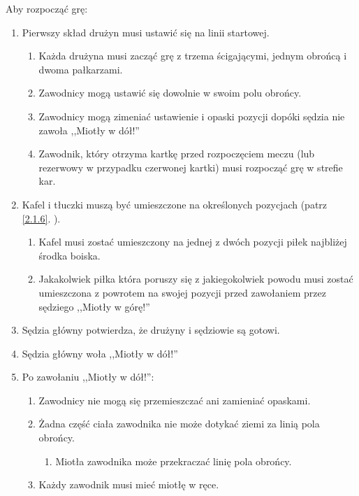 \documentclass[11pt,a4paper]{article}
\renewcommand{\subsubsection}[1]{
  \oldsubsubsection{#1}%
  \label{\thesubsubsection}
}
\newcommand{\myref}[1]{\ref{#1}. \nameref{#1}}
\begin{document}
\subsubsection{Procedura rozpoczęcia}
Aby rozpocząć grę:
\begin{enumerate}
  \item Pierwszy skład drużyn musi ustawić się na linii startowej.
  \begin{enumerate}
    \item Każda drużyna musi zacząć grę z trzema ścigającymi, jednym obrońcą i dwoma pałkarzami.
    \item Zawodnicy mogą ustawić się dowolnie w swoim polu obrońcy.
    \item Zawodnicy mogą zimeniać ustawienie i opaski pozycji dopóki sędzia nie zawoła ,,Miotły w dół!''
    \item Zawodnik, który otrzyma kartkę przed rozpoczęciem meczu (lub rezerwowy w przypadku czerwonej kartki) musi rozpocząć grę w strefie kar.
  \end{enumerate}
  \item Kafel i tłuczki muszą być umieszczone na określonych pozycjach (patrz \myref{2.1.6}).
  \begin{enumerate}
    \item Kafel musi zostać umieszczony na jednej z dwóch pozycji piłek najbliżej środka boiska.
    \item Jakakolwiek piłka która poruszy się z jakiegokolwiek powodu musi zostać umieszczona z
    powrotem na swojej pozycji przed zawołaniem przez sędziego ,,Miotły w górę!''
  \end{enumerate}
  \item Sędzia główny potwierdza, że drużyny i sędziowie są gotowi.
  \item Sędzia główny woła ,,Miotły w dół!''
  \item Po zawołaniu ,,Miotły w dół!'':
  \begin{enumerate}
    \item Zawodnicy nie mogą się przemieszczać ani zamieniać opaskami.
    \item Żadna część ciała zawodnika nie może dotykać ziemi za linią pola obrońcy.
    \begin{enumerate}
      \item Miotła zawodnika może przekraczać linię pola obrońcy.
    \end{enumerate}
    \item Każdy zawodnik musi mieć miotłę w ręce.
    \begin{enumerate}

\end{enumerate}
\end{enumerate}
\end{enumerate}
\end{document}
